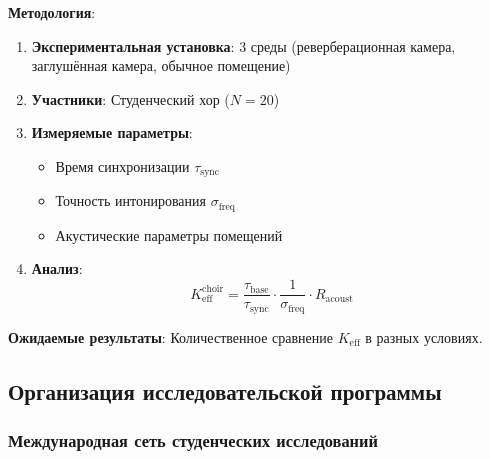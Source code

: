 \documentclass[12pt,a4paper]{article}
\begin{document}
	\textbf{Методология}:
	\begin{enumerate}
		\item \textbf{Экспериментальная установка}: 3 среды (реверберационная камера, заглушённая камера, обычное помещение)
		\item \textbf{Участники}: Студенческий хор ($N=20$)
		\item \textbf{Измеряемые параметры}:
		\begin{itemize}
			\item Время синхронизации $\tau_{\mathrm{sync}}$
			\item Точность интонирования $\sigma_{\mathrm{freq}}$
			\item Акустические параметры помещений
		\end{itemize}
		\item \textbf{Анализ}:
		\[
		K_{\mathrm{eff}}^{\mathrm{choir}} = \frac{\tau_{\mathrm{base}}}{\tau_{\mathrm{sync}}} \cdot \frac{1}{\sigma_{\mathrm{freq}}} \cdot R_{\mathrm{acoust}}
		\]
	\end{enumerate}
	
	\textbf{Ожидаемые результаты}: Количественное сравнение $K_{\mathrm{eff}}$ в разных условиях.
	
	\subsection{Организация исследовательской программы}
	
	\subsubsection{Международная сеть студенческих исследований}
	
\end{document}
